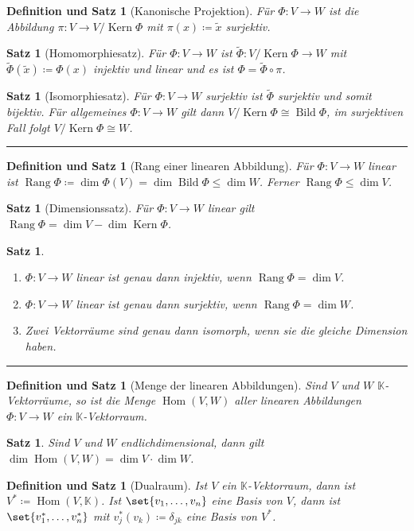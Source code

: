 \documentclass[a4paper]{article}
\newcounter{Sec}
\theoremstyle{marginbreak}
\newtheorem{satz}[definition]{Satz}
\newtheorem{defsatz}[definition]{Definition und Satz}
\DeclareMathOperator{\Kern}{Kern}
\DeclareMathOperator{\Bild}{Bild}
\DeclareMathOperator{\Rang}{Rang}
\DeclareMathOperator{\Hom}{Hom}
\newcommand{\sep}{%
	\rule{\textwidth}{0.3pt}%
	\stepcounter{Sec}%
	}
\begin{document}
	\begin{defsatz}[Kanonische Projektion]
		Für $\Phi\colon V\to W$ ist die Abbildung $\pi\colon V\to V/\Kern\Phi$ mit
		$\pi(x)\coloneqq\tilde{x}$ surjektiv.
	\end{defsatz}
	\begin{satz}[Homomorphiesatz]
		Für $\Phi\colon V\to W$ ist $\tilde{\Phi}\colon V/\Kern\Phi\to W$ mit
		$\tilde{\Phi}(\tilde{x})\coloneqq\Phi(x)$ injektiv und linear und es ist
		$\Phi = \tilde{\Phi}\circ\pi$.
	\end{satz}
	\begin{satz}[Isomorphiesatz]
		Für $\Phi\colon V\to W$ surjektiv ist $\tilde{\Phi}$ surjektiv und somit
		bijektiv. Für allgemeines $\Phi\colon V\to W$ gilt dann $V/\Kern\Phi\cong\Bild\Phi$,
		im surjektiven Fall folgt $V/\Kern\Phi\cong W$.
	\end{satz}
	\sep
	\begin{defsatz}[Rang einer linearen Abbildung]
		Für $\Phi\colon V\to W$ linear ist $\Rang\Phi\coloneqq\dim\Phi(V)=\dim\Bild\Phi\leq\dim W$.
		Ferner $\Rang\Phi\leq\dim V$.
	\end{defsatz}
	\begin{satz}[Dimensionssatz]
		Für $\Phi\colon V\to W$ linear gilt $\Rang\Phi = \dim V - \dim\Kern\Phi$.
	\end{satz}
	\begin{satz}
		\begin{enumerate}[label=(\alph*)]
			\item $\Phi\colon V\to W$ linear ist genau dann injektiv, wenn $\Rang\Phi=\dim V$.
			\item $\Phi\colon V\to W$ linear ist genau dann surjektiv, wenn $\Rang\Phi=\dim W$.
			\item Zwei Vektorräume sind genau dann isomorph, wenn sie die gleiche Dimension haben.
		\end{enumerate}
	\end{satz}
	\sep
	\begin{defsatz}[Menge der linearen Abbildungen]
		Sind $V$ und $W$ $\mathbb{K}$-Vektorräume, so ist die Menge $\Hom(V, W)$ aller
		linearen Abbildungen $\Phi\colon V\to W$ ein $\mathbb{K}$-Vektorraum.
	\end{defsatz}
	\begin{satz}
		Sind $V$ und $W$ endlichdimensional, dann gilt $\dim\Hom(V, W) = \dim V\cdot\dim W$.
	\end{satz}
	\begin{defsatz}[Dualraum]
		Ist $V$ ein $\mathbb{K}$-Vektorraum, dann ist $V^*\coloneqq\Hom(V,\mathbb{K})$.
		Ist $\set{v_1,\ldots,v_n}$ eine Basis von $V$, dann ist $\set{v_1^*,\ldots,v_n^*}$
		mit $v_j^*(v_k)\coloneqq\delta_{jk}$ eine Basis von $V^*$.
	\end{defsatz}
\end{document}
